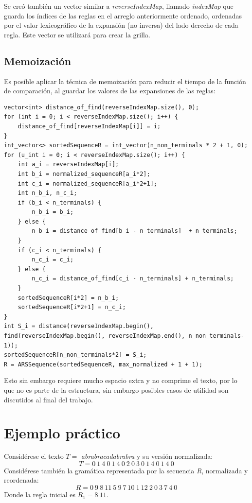 Se creó también un vector similar a \textit{reverseIndexMap}, llamado \textit{indexMap} que guarda los índices de las reglas en el arreglo anteriormente ordenado, ordenadas por el valor lexicográfico de la expansión (no inversa) del lado derecho de cada regla. Este vector se utilizará para crear la grilla.

\subsection{Memoización}

Es posible aplicar la técnica de memoización para reducir el tiempo de la función de comparación, al guardar los valores de las expansiones de las reglas:

\begin{lstlisting}[style=cppstyle, caption={\textit{Nueva secuencia R}}, label={lst:sort3}] 
vector<int> distance_of_find(reverseIndexMap.size(), 0);
for (int i = 0; i < reverseIndexMap.size(); i++) {
    distance_of_find[reverseIndexMap[i]] = i;        
}
int_vector<> sortedSequenceR = int_vector(n_non_terminals * 2 + 1, 0);
for (u_int i = 0; i < reverseIndexMap.size(); i++) {        
    int a_i = reverseIndexMap[i]; 
    int b_i = normalized_sequenceR[a_i*2];
    int c_i = normalized_sequenceR[a_i*2+1];
    int n_b_i, n_c_i;
    if (b_i < n_terminals) {
        n_b_i = b_i;
    } else {
        n_b_i = distance_of_find[b_i - n_terminals]  + n_terminals;
    }
    if (c_i < n_terminals) {
        n_c_i = c_i;
    } else {
        n_c_i = distance_of_find[c_i - n_terminals] + n_terminals;
    }
    sortedSequenceR[i*2] = n_b_i; 
    sortedSequenceR[i*2+1] = n_c_i; 
} 
int S_i = distance(reverseIndexMap.begin(), find(reverseIndexMap.begin(), reverseIndexMap.end(), n_non_terminals-1));  
sortedSequenceR[n_non_terminals*2] = S_i; 
R = ARSSequence(sortedSequenceR, max_normalized + 1 + 1);
\end{lstlisting}

Esto sin embargo requiere mucho espacio extra y no comprime el texto, por lo que no es parte de la estructura, sin embargo posibles casos de utilidad son discutidos al final del trabajo.

\section{Ejemplo práctico}

Considérese el texto $T =$ \textit{abrabracadabrabra} y su versión normalizada:
\[T = 0\ 1\ 4\ 0\ 1\ 4\ 0\ 2\ 0\ 3\ 0\ 1\ 4\ 0\ 1\ 4\ 0
\]
Considérese también la gramática representada por la secuencia \textit{R}, normalizada y reordenada:
\[ R = 0\ 9\ 8\ 11\ 5\ 9\ 7\ 10\ 1\ 12\ 2\ 0\ 3\ 7\ 4\ 0  \] 
Donde la regla inicial es $R_1 = 8\ 11$.

